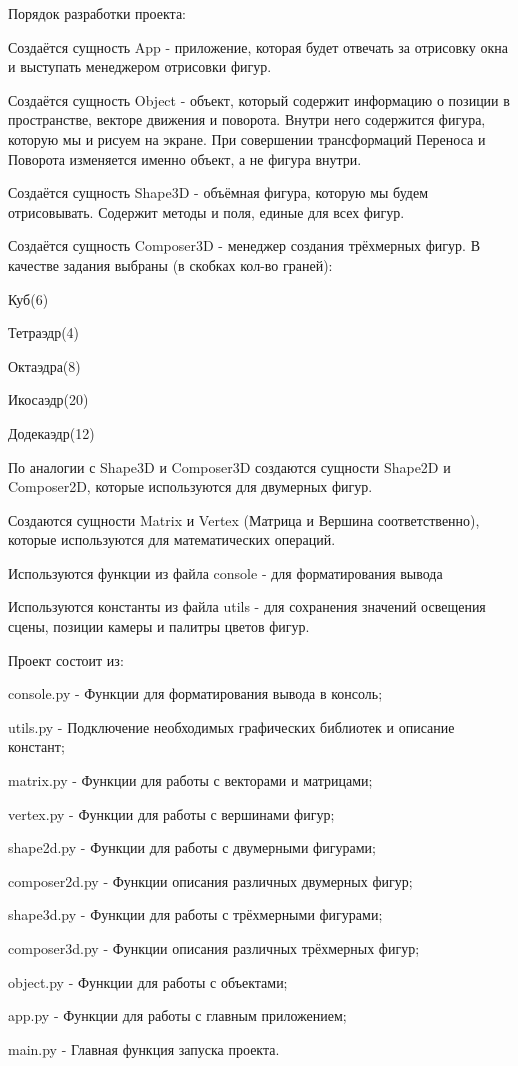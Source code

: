 \documentclass[12pt, a4paper]{article}
\begin{document}
Порядок разработки проекта:
\begin{list}{}{}
	\item Создаётся сущность App - приложение, которая будет отвечать за отрисовку окна и выступать менеджером отрисовки фигур.
	\item Создаётся сущность Object - объект, который содержит информацию о позиции в пространстве, векторе движения и поворота. Внутри него содержится фигура, которую мы и рисуем на экране. При совершении трансформаций Переноса и Поворота изменяется именно объект, а не фигура внутри.
	\item Создаётся сущность Shape3D - объёмная фигура, которую мы будем отрисовывать. Содержит методы и поля, единые для всех фигур.
	\item Создаётся сущность Composer3D - менеджер создания трёхмерных фигур. В качестве задания выбраны (в скобках кол-во граней):
	\begin{list}{-}{}
		\item Куб(6)
		\item Тетраэдр(4)
		\item Октаэдра(8)
		\item Икосаэдр(20)
		\item Додекаэдр(12)
	\end{list}
	\item По аналогии с Shape3D и Composer3D создаются сущности Shape2D и Composer2D, которые используются для двумерных фигур.
	\item Создаются сущности Matrix и Vertex (Матрица и Вершина соответственно), которые используются для математических операций.
	\item Используются функции из файла console - для форматирования вывода
	\item Используются константы из файла utils - для сохранения значений освещения сцены, позиции камеры и палитры цветов фигур.
\end{list}

Проект состоит из:
\begin{list}{-}{}
	\item console.py - Функции для форматирования вывода в консоль;
	\item utils.py - Подключение необходимых графических библиотек и описание констант;
	\item matrix.py - Функции для работы с векторами и матрицами;
	\item vertex.py - Функции для работы с вершинами фигур;
	\item shape2d.py - Функции для работы с двумерными фигурами;
	\item composer2d.py - Функции описания различных двумерных фигур;
	\item shape3d.py - Функции для работы с трёхмерными фигурами;
	\item composer3d.py - Функции описания различных трёхмерных фигур;
	\item object.py - Функции для работы с объектами;
	\item app.py - Функции для работы с главным приложением;
	\item main.py - Главная функция запуска проекта.
\end{list}
\end{document}
